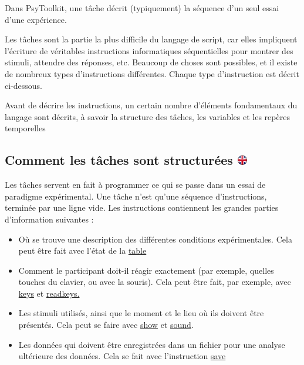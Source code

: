 \documentclass[
]{book}
\providecommand{\tightlist}{%
  \setlength{\itemsep}{0pt}\setlength{\parskip}{0pt}}
\begin{document}
Dans PsyToolkit, une tâche décrit (typiquement) la séquence d'un seul essai d'une expérience.

Les tâches sont la partie la plus difficile du langage de script, car elles impliquent l'écriture de véritables instructions informatiques séquentielles pour montrer des stimuli, attendre des réponses, etc. Beaucoup de choses sont possibles, et il existe de nombreux types d'instructions différentes. Chaque type d'instruction est décrit ci-dessous.

Avant de décrire les instructions, un certain nombre d'éléments fondamentaux du langage sont décrits, à savoir la structure des tâches, les variables et les repères temporelles

\hypertarget{comment-les-tuxe2ches-sont-structuruxe9es}{%
\subsection[Comment les tâches sont structurées ]{\texorpdfstring{Comment les tâches sont structurées \href{https://www.psytoolkit.org/doc3.2.0/syntax.html\#_how_tasks_are_structured}{\protect\includegraphics{img/ukflag.png}}}{Comment les tâches sont structurées }}\label{comment-les-tuxe2ches-sont-structuruxe9es}}

Les tâches servent en fait à programmer ce qui se passe dans un essai de paradigme expérimental. Une tâche n'est qu'une séquence d'instructions, terminée par une ligne vide. Les instructions contiennent les grandes parties d'information suivantes :

\begin{itemize}
\tightlist
\item
  Où se trouve une description des différentes conditions expérimentales. Cela peut être fait avec l'état de la \protect\hyperlink{task-table}{table}
\item
  Comment le participant doit-il réagir exactement (par exemple, quelles touches du clavier, ou avec la souris). Cela peut être fait, par exemple, avec \protect\hyperlink{task-keys}{keys} et \protect\hyperlink{task-readkey}{readkeys.}
\item
  Les stimuli utilisés, ainsi que le moment et le lieu où ils doivent être présentés. Cela peut se faire avec \protect\hyperlink{task-show}{show} et \protect\hyperlink{task-sound}{sound}.
\item
  Les données qui doivent être enregistrées dans un fichier pour une analyse ultérieure des données. Cela se fait avec l'instruction \protect\hyperlink{task-save}{save}
\end{itemize}
\end{document}
